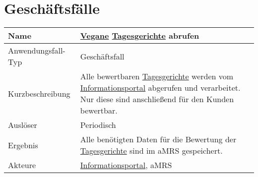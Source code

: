 \section{Geschäftsfälle}\label{sec:Geschaeftsfaelle}


\begin{table}[H]
    \centering
    \label{veganetagesgerichteabrufen}
    \begin{tabularx}{\textwidth}{| l | X |}
        \hline
        Name               & \hyperref[gls:vegan]{Vegane} \hyperref[gls:tagesgericht]{Tagesgerichte} abrufen                                                                                                                               \\
        \hline
        Anwendungsfall-Typ & Geschäftsfall                                                                                                                                                                                                 \\
        \hline
        Kurzbeschreibung   & Alle bewertbaren \hyperref[gls:tagesgericht]{Tagesgerichte} werden vom \hyperref[gls:informationsportal]{Informationsportal} abgerufen und verarbeitet. Nur diese sind anschließend für den Kunden bewertbar. \\
        \hline
        Auslöser           & Periodisch                                                                                                                                                                                                    \\
        \hline
        Ergebnis           & Alle benötigten Daten für die Bewertung der \hyperref[gls:tagesgericht]{Tagesgerichte} sind im aMRS gespeichert.                                                                                              \\
        \hline
        Akteure            & \hyperref[gls:informationsportal]{Informationsportal}, \ac{aMRS}                                                                                                                                              \\
        \hline
    \end{tabularx}
\end{table}


